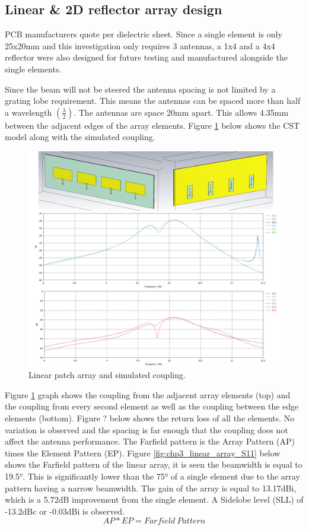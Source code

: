 \subsection{Linear \& 2D reflector array design}
PCB manufacturers quote per dielectric sheet. Since a single element is only 25x20mm and this investigation only requires 3 antennas, a 1x4 and a 4x4 reflector were also designed for future testing and manufactured alongside the single elements.

Since the beam will not be steered the antenna spacing is not limited by a grating lobe requirement. This means the antennas can be spaced more than half a wavelength \(\left(\frac{\lambda}{2}\right)\). The antennas are space 20mm apart. This allows 4.35mm between the adjacent edges of the array elements. Figure \ref{fig:chp3_linear_array_combined} below shows the CST model along with the simulated coupling.

    \begin{figure}[H]
    \centering
    \includegraphics[width=0.99\linewidth]{Figures/chp3_linear_array_combined.png}
    \caption{Linear patch array and simulated coupling.}
    \label{fig:chp3_linear_array_combined}
    \end{figure}

Figure \ref{fig:chp3_linear_array_combined} graph shows the coupling from the adjacent array elements (top) and the coupling from every second element as well as the coupling between the edge elements (bottom). Figure ? below shows the return loss of all the elements. No variation is observed and the spacing is far enough that the coupling does not affect the antenna performance. The Farfield pattern is the Array Pattern (AP) times the Element Pattern (EP). Figure \ref{fig:chp3_linear_array_S11} below shows the Farfield pattern of the linear array, it is seen the beamwidth is equal to 19.5°. This is significantly lower than the 75° of a single element due to the array pattern having a narrow beamwidth. The gain of the array is equal to 13.17dBi, which is a 5.72dB improvement from the single element. A Sidelobe level (SLL) of -13.2dBc or -0.03dBi is observed.
    \[AP*EP=Farfield\ Pattern\]

